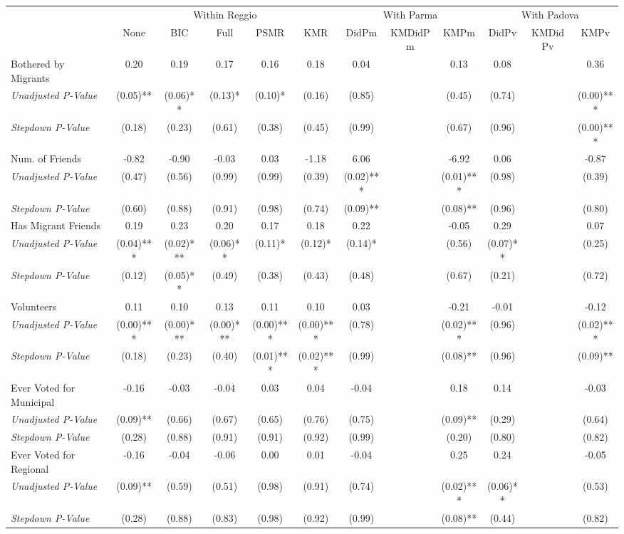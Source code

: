 \begin{tabular}{l c c c c c c c c c c c}
\toprule
& \multicolumn{5}{c}{Within Reggio} & \multicolumn{3}{c}{With Parma} & \multicolumn{3}{c}{With Padova} \\\cmidrule(lr){2-6} \cmidrule(lr){7-9} \cmidrule(lr){10-12}
 & None & BIC & Full & PSMR & KMR & DidPm & KMDidPm & KMPm & DidPv & KMDidPv & KMPv \\
\midrule
Bothered by Migrants & 0.20 & 0.19 & 0.17 & 0.16 & 0.18 & 0.04 & & 0.13 & 0.08 & & 0.36 \\
\quad \textit{Unadjusted P-Value} & (0.05)** & (0.06)** & (0.13)* & (0.10)* & (0.16) & (0.85) & & (0.45) & (0.74) & & (0.00)*** \\
\quad \textit{Stepdown P-Value} & (0.18) & (0.23) & (0.61) & (0.38) & (0.45) & (0.99) & & (0.67) & (0.96) & & (0.00)*** \\
Num. of Friends & -0.82 & -0.90 & -0.03 & 0.03 & -1.18 & 6.06 & & -6.92 & 0.06 & & -0.87 \\
\quad \textit{Unadjusted P-Value} & (0.47) & (0.56) & (0.99) & (0.99) & (0.39) & (0.02)*** & & (0.01)*** & (0.98) & & (0.39) \\
\quad \textit{Stepdown P-Value} & (0.60) & (0.88) & (0.91) & (0.98) & (0.74) & (0.09)** & & (0.08)** & (0.96) & & (0.80) \\
Has Migrant Friends & 0.19 & 0.23 & 0.20 & 0.17 & 0.18 & 0.22 & & -0.05 & 0.29 & & 0.07 \\
\quad \textit{Unadjusted P-Value} & (0.04)*** & (0.02)*** & (0.06)** & (0.11)* & (0.12)* & (0.14)* & & (0.56) & (0.07)** & & (0.25) \\
\quad \textit{Stepdown P-Value} & (0.12) & (0.05)** & (0.49) & (0.38) & (0.43) & (0.48) & & (0.67) & (0.21) & & (0.72) \\
Volunteers & 0.11 & 0.10 & 0.13 & 0.11 & 0.10 & 0.03 & & -0.21 & -0.01 & & -0.12 \\
\quad \textit{Unadjusted P-Value} & (0.00)*** & (0.00)*** & (0.00)*** & (0.00)*** & (0.00)*** & (0.78) & & (0.02)*** & (0.96) & & (0.02)*** \\
\quad \textit{Stepdown P-Value} & (0.18) & (0.23) & (0.40) & (0.01)*** & (0.02)*** & (0.99) & & (0.08)** & (0.96) & & (0.09)** \\
Ever Voted for Municipal & -0.16 & -0.03 & -0.04 & 0.03 & 0.04 & -0.04 & & 0.18 & 0.14 & & -0.03 \\
\quad \textit{Unadjusted P-Value} & (0.09)** & (0.66) & (0.67) & (0.65) & (0.76) & (0.75) & & (0.09)** & (0.29) & & (0.64) \\
\quad \textit{Stepdown P-Value} & (0.28) & (0.88) & (0.91) & (0.91) & (0.92) & (0.99) & & (0.20) & (0.80) & & (0.82) \\
Ever Voted for Regional & -0.16 & -0.04 & -0.06 & 0.00 & 0.01 & -0.04 & & 0.25 & 0.24 & & -0.05 \\
\quad \textit{Unadjusted P-Value} & (0.09)** & (0.59) & (0.51) & (0.98) & (0.91) & (0.74) & & (0.02)*** & (0.06)** & & (0.53) \\
\quad \textit{Stepdown P-Value} & (0.28) & (0.88) & (0.83) & (0.98) & (0.92) & (0.99) & & (0.08)** & (0.44) & & (0.82) \\
\bottomrule
\end{tabular}
